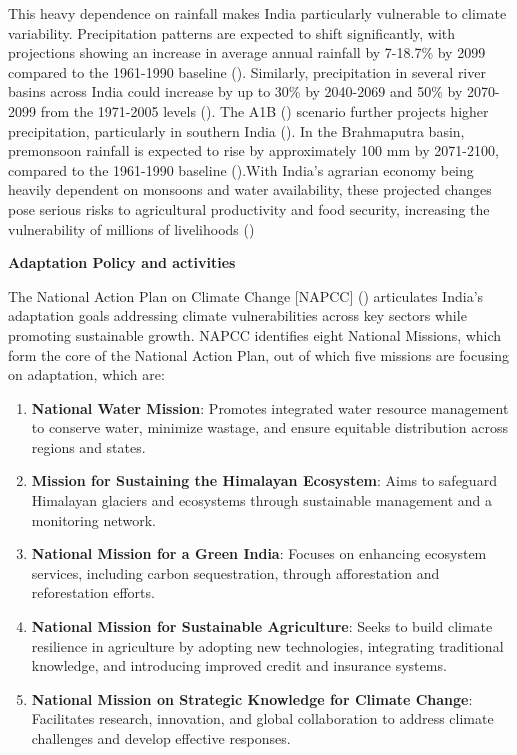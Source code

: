 \documentclass[12pt]{article}
\newcommand{\regularsubsection}[1]{%
  \vspace{1em} %
  \noindent\textbf{#1}\par\vspace{-0.3em}}
\begin{document}
This heavy dependence on rainfall makes India particularly vulnerable to climate variability. Precipitation patterns are expected 
to shift significantly, with projections showing an increase in average annual rainfall by 7-18.7\% by 2099 compared to the 1961-1990 baseline (\cite{chaturvedi_2012}).
Similarly, precipitation in several river basins across India could increase by up to 30\% by 2040-2069 and 50\% by 2070-2099 from the 1971-2005 levels (\cite{mishra_2016}).
The A1B (\cite{ipcc_2000}) scenario further projects higher precipitation, particularly in southern India (\cite{kim_2009}). In the Brahmaputra basin, premonsoon rainfall is expected 
to rise by approximately 100 mm by 2071-2100, compared to the 1961-1990 baseline (\cite{ghosh_2012}).With India’s agrarian economy being heavily dependent on monsoons and water 
availability, these projected changes pose serious risks to agricultural productivity and food security, increasing the vulnerability of millions of livelihoods (\cite{goyal_2018})



\pagebreak

\regularsubsection{Adaptation Policy and activities}
The National Action Plan on Climate Change [NAPCC] (\cite{napcc_2008}) articulates India's adaptation goals addressing climate 
vulnerabilities across key sectors while promoting sustainable growth. NAPCC identifies eight National Missions, which form 
the core of the National Action Plan, out of which five missions are focusing on adaptation, which are:
\begin{enumerate}
  \item \textbf{National Water Mission}: Promotes integrated water resource management to conserve water, minimize wastage, 
  and ensure equitable distribution across regions and states.  
  \item \textbf{Mission for Sustaining the Himalayan Ecosystem}: Aims to safeguard Himalayan glaciers and ecosystems through 
  sustainable management and a monitoring network.  
  \item \textbf{National Mission for a Green India}: Focuses on enhancing ecosystem services, including carbon sequestration, 
  through afforestation and reforestation efforts.
  \item \textbf{National Mission for Sustainable Agriculture}: Seeks to build climate resilience in agriculture by adopting new 
  technologies, integrating traditional knowledge, and introducing improved credit and insurance systems. 
  \item \textbf{National Mission on Strategic Knowledge for Climate Change}: Facilitates research, innovation, 
  and global collaboration to address climate challenges and develop effective responses.
\end{enumerate}
\end{document}
